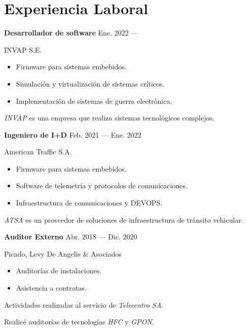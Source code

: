\section{Experiencia Laboral}


\parbox[t][][t]{\linewidth}{
	\parbox{\linewidth}{
		\textbf{Desarrollador de software}
			\hfill
			{Ene. 2022 --- \phantom{Dic. 2021}}
		}
	\smallbreak
	\parbox{\linewidth}{INVAP S.E.}
	\smallbreak
	\begin{itemize}
	    \item{Firmware para sistemas embebidos.}
        \item{Simulación y virtualización de sistemas críticos.}
        \item{Implementación de sistemas de guerra electrónica.}
	\end{itemize}
	\smallbreak
    \emph{INVAP} es una empresa que realiza sistemas tecnológicos complejos.
}

\bigskip
\parbox[t][][t]{\linewidth}{
	\parbox{\linewidth}{
		\textbf{Ingeniero de I+D}
			\hfill
			{Feb. 2021 --- Ene. 2022}
		}
	\smallbreak
	\parbox{\linewidth}{American Traffic S.A.}
	\smallbreak
	\begin{itemize}
	    \item{Firmware para sistemas embebidos.}
	    \item{Software de telemetría y protocolos de comunicaciones.}
        \item{Infraestructura de comunicaciones y DEVOPS.}
	\end{itemize}
	\smallbreak
    \emph{ATSA} es un proveedor de soluciones de infraestructura de tránsito vehicular.
}

\bigskip
\parbox[t][][t]{\linewidth}{
	\parbox{\linewidth}{
		\textbf{Auditor Externo}
			\hfill
			{Abr. 2018 --- Dic. 2020}
		}
	\smallbreak
	\parbox{\linewidth}{Picado, Levy De Angelis \& Asociados}
	\smallbreak
	\begin{itemize}
	    \item{Auditorías de instalaciones.}
	    \item{Asistencia a contratas.}
	\end{itemize}
	\smallbreak
	Actividades realizadas al servicio de \emph{Telecentro SA}.

    Realicé auditorías de tecnologías \emph{HFC} y \emph{GPON}.
}

